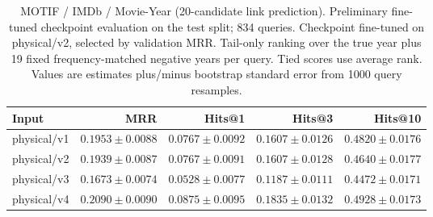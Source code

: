 \begin{table}[t]
\centering
\small
\begin{tabular}{lrrrr}
\toprule
Input & MRR & Hits@1 & Hits@3 & Hits@10 \\
\midrule
physical/v1 & $0.1953 \pm 0.0088$ & $0.0767 \pm 0.0092$ & $0.1607 \pm 0.0126$ & $0.4820 \pm 0.0176$ \\
physical/v2 & $0.1939 \pm 0.0087$ & $0.0767 \pm 0.0091$ & $0.1607 \pm 0.0128$ & $0.4640 \pm 0.0177$ \\
physical/v3 & $0.1673 \pm 0.0074$ & $0.0528 \pm 0.0077$ & $0.1187 \pm 0.0111$ & $0.4472 \pm 0.0171$ \\
physical/v4 & $0.2090 \pm 0.0090$ & $0.0875 \pm 0.0095$ & $0.1835 \pm 0.0132$ & $0.4928 \pm 0.0173$ \\
\bottomrule
\end{tabular}
\caption{MOTIF / IMDb / Movie-Year (20-candidate link prediction). Preliminary fine-tuned checkpoint evaluation on the test split; 834 queries. Checkpoint fine-tuned on physical/v2, selected by validation MRR. Tail-only ranking over the true year plus 19 fixed frequency-matched negative years per query. Tied scores use average rank. Values are estimates plus/minus bootstrap standard error from 1000 query resamples.}
\label{tab:motif-movie_year-link_prediction}
\end{table}

